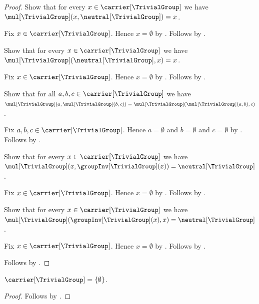 \begin{proof}
    Show that for every $x\in\carrier[\TrivialGroup]$ we have
        $\mul[\TrivialGroup](x,\neutral[\TrivialGroup])=x$.
    \begin{subproof}
        Fix $x\in\carrier[\TrivialGroup]$.
        Hence $x=\emptyset$ by .
        Follows by .
    \end{subproof}
    Show that for every $x\in\carrier[\TrivialGroup]$ we have
        $\mul[\TrivialGroup](\neutral[\TrivialGroup],x)=x$.
    \begin{subproof}
        Fix $x\in\carrier[\TrivialGroup]$.
        Hence $x=\emptyset$ by .
        Follows by .
    \end{subproof}
    Show that for all $a,b,c\in\carrier[\TrivialGroup]$ we have
        $\mul[\TrivialGroup](a,\mul[\TrivialGroup](b,c))
            =\mul[\TrivialGroup](\mul[\TrivialGroup](a,b),c)$.
    \begin{subproof}
        Fix $a,b,c\in\carrier[\TrivialGroup]$.
        Hence $a=\emptyset$ and $b=\emptyset$ and $c=\emptyset$ by
            .
        Follows by .
    \end{subproof}
    Show that for every $x\in\carrier[\TrivialGroup]$ we have
        $\mul[\TrivialGroup](x,\groupInv[\TrivialGroup](x))
            =\neutral[\TrivialGroup]$.
    \begin{subproof}
        Fix $x\in\carrier[\TrivialGroup]$.
        Hence $x=\emptyset$ by .
        Follows by
            .
    \end{subproof}
    Show that for every $x\in\carrier[\TrivialGroup]$ we have
        $\mul[\TrivialGroup](\groupInv[\TrivialGroup](x),x)
            =\neutral[\TrivialGroup]$.
    \begin{subproof}
        Fix $x\in\carrier[\TrivialGroup]$.
        Hence $x=\emptyset$ by .
        Follows by
            .
    \end{subproof}
    Follows by .
\end{proof}

\begin{proposition}\label{trivial_group_carrier}
    $\carrier[\TrivialGroup]=\{\emptyset\}$.
\end{proposition}
\begin{proof}
    Follows by .
\end{proof}

